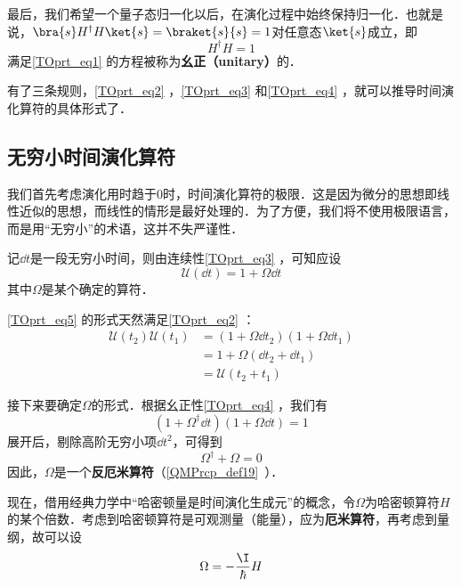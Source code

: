 最后，我们希望一个量子态归一化以后，在演化过程中始终保持归一化．也就是说，$\bra{s}H^\dagger H\ket{s}=\braket{s}{s}=1$对任意态$\ket{s}$成立，即
\begin{equation}\label{TOprt_eq4}
H^\dagger H=1
\end{equation}
满足\autoref{TOprt_eq1} 的方程被称为\textbf{幺正（unitary）}的．



有了三条规则，\autoref{TOprt_eq2} ，\autoref{TOprt_eq3} 和\autoref{TOprt_eq4} ，就可以推导时间演化算符的具体形式了．


\subsection{无穷小时间演化算符}

我们首先考虑演化用时趋于$0$时，时间演化算符的极限．这是因为微分的思想即线性近似的思想，而线性的情形是最好处理的．为了方便，我们将不使用极限语言，而是用“无穷小”的术语，这并不失严谨性．

记$\dd t$是一段无穷小时间，则由连续性\autoref{TOprt_eq3} ，可知应设
\begin{equation}\label{TOprt_eq5}
\mathcal{U}(\dd t) = 1+\Omega \dd t
\end{equation}
其中$\Omega$是某个确定的算符．

\autoref{TOprt_eq5} 的形式天然满足\autoref{TOprt_eq2} ：
\begin{equation}
\begin{aligned}
\mathcal{U}(t_2)\mathcal{U}(t_1)&=(1+\Omega \dd t_2)(1+\Omega \dd t_1)\\
&=1+\Omega(\dd t_2+\dd t_1)\\
&=\mathcal{U}(t_2+t_1)
\end{aligned}
\end{equation}

接下来要确定$\Omega$的形式．根据幺正性\autoref{TOprt_eq4} ，我们有
\begin{equation}
(1+\Omega^\dagger \dd t)(1+\Omega \dd t)=1
\end{equation}
展开后，剔除高阶无穷小项$\dd t^2$，可得到
\begin{equation}
\Omega^\dagger + \Omega = 0
\end{equation}
因此，$\Omega$是一个\textbf{反厄米算符}（\autoref{QMPrcp_def19}~）．


现在，借用经典力学中“哈密顿量是时间演化生成元”的概念，令$\Omega$为哈密顿算符$H$的某个倍数．考虑到哈密顿算符是可观测量（能量），应为\textbf{厄米算符}，再考虑到量纲，故可以设
\begin{equation}\label{TOprt_eq6}
\Omega=-\frac{\I}{\hbar}H
\end{equation}

